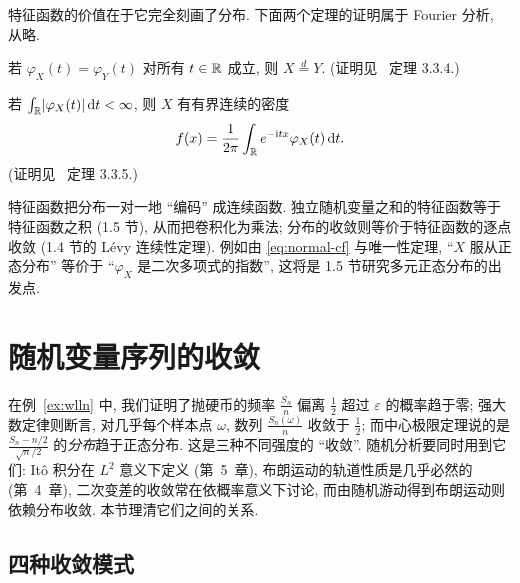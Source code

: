 特征函数的价值在于它完全刻画了分布. 下面两个定理的证明属于 Fourier 分析, 从略.

\begin{theorem}[唯一性定理]\label{thm:cf-uniqueness}
若 $\varphi_X(t)=\varphi_Y(t)$ 对所有 $t\in\mathbb{R}$ 成立, 则 $X\overset{d}{=}Y$. (证明见~\cite{durrett} 定理 3.3.4.)
\end{theorem}

\begin{theorem}[反演公式]\label{thm:inversion}
若 $\int_{\mathbb{R}}\lvert\varphi_X(t)\rvert\mathop{}\!\mathrm{d} t<\infty$, 则 $X$ 有有界连续的密度
\[
f(x)=\frac{1}{2\pi}\int_{\mathbb{R}}e^{-\mathrm{i}tx}\varphi_X(t)\mathop{}\!\mathrm{d} t.
\]
(证明见~\cite{durrett} 定理 3.3.5.)
\end{theorem}

\begin{intuition}
特征函数把分布一对一地 ``编码'' 成连续函数. 独立随机变量之和的特征函数等于特征函数之积 (1.5 节), 从而把卷积化为乘法; 分布的收敛则等价于特征函数的逐点收敛 (1.4 节的 L\'evy 连续性定理). 例如由 \eqref{eq:normal-cf} 与唯一性定理, ``$X$ 服从正态分布'' 等价于 ``$\varphi_X$ 是二次多项式的指数'', 这将是 1.5 节研究多元正态分布的出发点.
\end{intuition}

\section{随机变量序列的收敛}
\label{sec:1-4}

在例~\ref{ex:wlln} 中, 我们证明了抛硬币的频率 $\frac{S_n}{n}$ 偏离 $\frac{1}{2}$ 超过 $\varepsilon$ 的概率趋于零; 强大数定律则断言, 对几乎每个样本点 $\omega$, 数列 $\frac{S_n(\omega)}{n}$ 收敛于 $\frac{1}{2}$; 而中心极限定理说的是 $\frac{S_n-n/2}{\sqrt{n}/2}$ 的\emph{分布}趋于正态分布. 这是三种不同强度的 ``收敛''. 随机分析要同时用到它们: Itô 积分在 $L^2$ 意义下定义 (第~5~章), 布朗运动的轨道性质是几乎必然的 (第~4~章), 二次变差的收敛常在依概率意义下讨论, 而由随机游动得到布朗运动则依赖分布收敛. 本节理清它们之间的关系.

\subsection{四种收敛模式}

